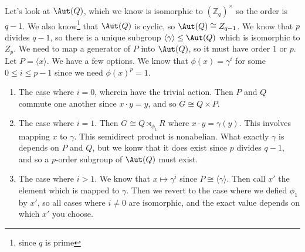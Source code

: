 Let's look at $\Aut(Q)$, which we know is isomorphic to $(\mathbb{Z}_q)^\times$ so the order is $q-1$. We also know\footnote{since $q$ is prime} that $\Aut(Q)$ is cyclic, so $\Aut(Q) \cong Z_{q-1}$. We know that $p$ divides $q-1$, so there is a unique subgroup $\langle \gamma \rangle \leq \Aut(Q)$ which is isomorphic to $Z_p$. We need to map a generator of $P$ into $\Aut(Q)$, so it must have order $1$ or $p$. Let $P = \langle x \rangle$. We have a few options. We know that $\phi(x) = \gamma^i$ for some $0 \leq i \leq p-1$ since we need $\phi(x)^p = 1$.
\begin{enumerate}
\item The case where $i = 0$, wherein have the trivial action. Then $P$ and $Q$ commute one another since $x \cdot y = y$, and so $G \cong Q \times P$.

\item The case where $i = 1$. Then $G \cong Q \rtimes_{\phi_1} R$ where $x \cdot y = \gamma(y)$. This involves mapping $x$ to $\gamma$. This semidirect product is nonabelian. What exactly $\gamma$ is depends on $P$ and $Q$, but we konw that it does exist since $p$ divides $q-1$, and so a $p$-order subgroup of $\Aut(Q)$ must exist.

\item The case where $i > 1$. We know that $x \mapsto \gamma^i$ since $P \cong \langle \gamma \rangle$. Then call $x'$ the element which is mapped to $\gamma$. Then we revert to the case where we defied $\phi_1$ by $x'$, so all cases where $i \not= 0$ are isomorphic, and the exact value depends on which $x'$ you choose. 
\end{enumerate}